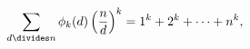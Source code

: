 \[\sum_{d\divides n}\mathop{\phi_{k}\/}\nolimits\!\left(d\right)\left(\frac{n}{d%
}\right)^{k}=1^{k}+2^{k}+\dots+n^{k},\]